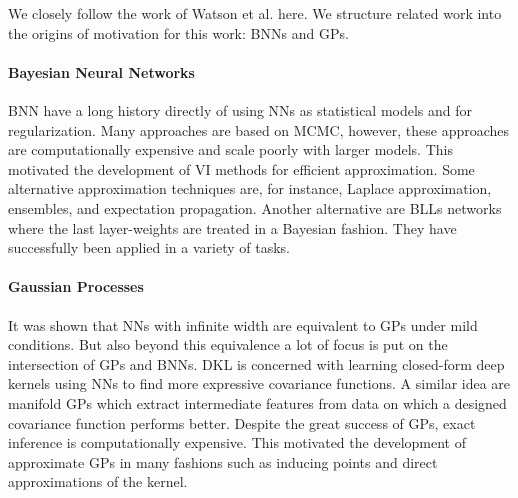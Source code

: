We closely follow the work of Watson et al.\cite{watsonLatentDerivativeBayesian2021} here.
We structure related work into the origins of motivation for this work: \aclp{BNN} and \aclp{GP}.

\paragraph{Bayesian Neural Networks}
\acl{BNN} have a long history directly of using \acp{NN} as statistical models\cite{mackayPracticalBayesianFramework1992} and for regularization\cite{hintonKeepingNeuralNetworks1993}.
Many approaches are based on \ac{MCMC}\cite{andrieuIntroductionMCMCMachine2003,hoffmanNoUTurnSamplerAdaptively2014,chenStochasticGradientHamiltonian2014}, however, these approaches are computationally expensive and scale poorly with larger models.
This motivated the development of \ac{VI} methods for efficient approximation\cite{hintonKeepingNeuralNetworks1993,petersonExplorationsMeanField1989,gravesPracticalVariationalInference2011}.
Some alternative approximation techniques are, for instance, Laplace approximation\cite{mackayPracticalBayesianFramework1992,denkerTransformingNeuralNetOutput1990,ritterScalableLaplaceApproximation2018}, ensembles\cite{lakshminarayananSimpleScalablePredictive2017,osbandRandomizedPriorFunctions2018,barberEnsembleLearningBayesian1998,pearceUncertaintyNeuralNetworks2020}, and expectation propagation\cite{hernandez-lobatoProbabilisticBackpropagationScalable2015}.
Another alternative are \acp{BLL} networks where the last layer-weights are treated in a Bayesian fashion\cite{lazaro-gredillaMarginalizedNeuralNetwork2010}.
They have successfully been applied in a variety of tasks\cite{snoekScalableBayesianOptimization2015,weberOptimizingBayesianLast2018,riquelmeDeepBayesianBandits2018,pinslerBayesianBatchActive2019,odonoghueUncertaintyBellmanEquation2018,oberBenchmarkingNeuralLinear2019}.


\paragraph{Gaussian Processes}
It was shown that \acp{NN} with infinite width are equivalent to \acp{GP} under mild conditions\cite{nealBayesianLearningNeural2012}.
But also beyond this equivalence a lot of focus is put on the intersection of \acp{GP} and \acp{BNN}.
\ac{DKL}\cite{wilsonDeepKernelLearning2016} is concerned with learning closed-form deep kernels using \acp{NN} to find more expressive covariance functions.
A similar idea are manifold \acp{GP}\cite{calandraManifoldGaussianProcesses2016} which extract intermediate features from data on which a designed covariance function performs better.
Despite the great success of \acp{GP}, exact inference is computationally expensive.
This motivated the development of approximate \acp{GP} in many fashions such as inducing points and direct approximations of the kernel\cite{nystromUberPraktischeAuflosung1930,rahimiRandomFeaturesLargeScale2007}.
